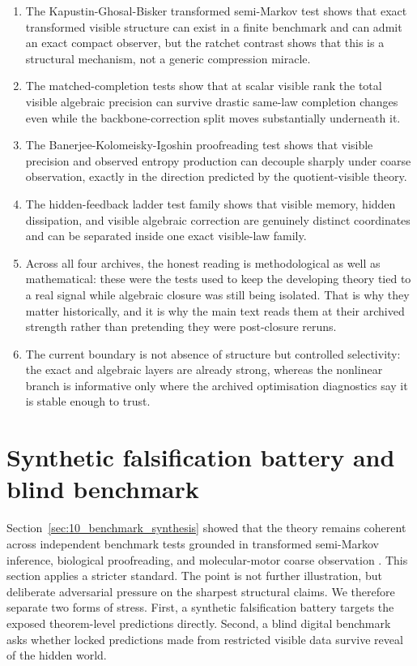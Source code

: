 \documentclass[11pt]{article}
\numberwithin{equation}{section}
\theoremstyle{thmcompact}
\theoremstyle{remark}
\begin{document}
\begin{enumerate}[label=(\roman*)]
\item The Kapustin-Ghosal-Bisker transformed semi-Markov test shows that exact transformed visible structure can exist in a finite benchmark and can admit an exact compact observer, but the ratchet contrast shows that this is a structural mechanism, not a generic compression miracle.
\item The matched-completion tests show that at scalar visible rank the total visible algebraic precision can survive drastic same-law completion changes even while the backbone-correction split moves substantially underneath it.
\item The Banerjee-Kolomeisky-Igoshin proofreading test shows that visible precision and observed entropy production can decouple sharply under coarse observation, exactly in the direction predicted by the quotient-visible theory.
\item The hidden-feedback ladder test family shows that visible memory, hidden dissipation, and visible algebraic correction are genuinely distinct coordinates and can be separated inside one exact visible-law family.
\item Across all four archives, the honest reading is methodological as well as mathematical: these were the tests used to keep the developing theory tied to a real signal while algebraic closure was still being isolated. That is why they matter historically, and it is why the main text reads them at their archived strength rather than pretending they were post-closure reruns.
\item The current boundary is not absence of structure but controlled selectivity: the exact and algebraic layers are already strong, whereas the nonlinear branch is informative only where the archived optimisation diagnostics say it is stable enough to trust.
\end{enumerate}



\section{Synthetic falsification battery and blind benchmark}
\label{sec:11_falsification}

Section~\ref{sec:10_benchmark_synthesis} showed that the theory remains coherent across independent benchmark tests grounded in transformed semi-Markov inference, biological proofreading, and molecular-motor coarse observation \cite{KapustinGhosalBisker2024,BanerjeeKolomeiskyIgoshin2017,LiepeltLipowsky2007}. This section applies a stricter standard. The point is not further illustration, but deliberate adversarial pressure on the sharpest structural claims. We therefore separate two forms of stress. First, a synthetic falsification battery targets the exposed theorem-level predictions directly. Second, a blind digital benchmark asks whether locked predictions made from restricted visible data survive reveal of the hidden world.
\end{document}
